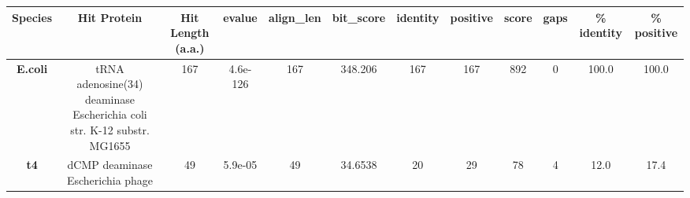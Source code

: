 \begin{tabular}{|c|c|c|c|c|c|c|c|c|c|c|c|} \hline
\textbf{Species} & \textbf{Hit Protein} & \textbf{Hit Length (a.a.)} & \textbf{evalue} & \textbf{align\_len} & \textbf{bit\_score} & \textbf{identity} & \textbf{positive} & \textbf{score} & \textbf{gaps} & \textbf{\% identity} & \textbf{\% positive} \\ \hline
\textbf{E.coli} & tRNA adenosine(34) deaminase Escherichia coli str. K-12 substr. MG1655 & 167 & 4.6e-126 & 167 & 348.206 & 167 & 167 & 892 & 0 & 100.0 & 100.0\\
\textbf{t4} & dCMP deaminase Escherichia phage  & 49 & 5.9e-05 & 49 & 34.6538 & 20 & 29 & 78 & 4 & 12.0 & 17.4\\
\hline \end{tabular}
